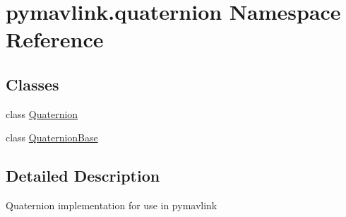\hypertarget{namespacepymavlink_1_1quaternion}{}\section{pymavlink.\+quaternion Namespace Reference}
\label{namespacepymavlink_1_1quaternion}
\subsection*{Classes}
\begin{DoxyCompactItemize}
\item 
class \mbox{\hyperlink{classpymavlink_1_1quaternion_1_1Quaternion}{Quaternion}}
\item 
class \mbox{\hyperlink{classpymavlink_1_1quaternion_1_1QuaternionBase}{Quaternion\+Base}}
\end{DoxyCompactItemize}


\subsection{Detailed Description}
\begin{DoxyVerb}Quaternion implementation for use in pymavlink
\end{DoxyVerb}
 